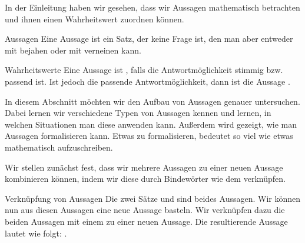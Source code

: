\documentclass[../../main.tex]{subfiles}
\begin{document}
\newcommand{\statementIcon}[3]{
    \begin{tikzpicture}[onbase]
        \node at (0,0) {\texttt{[image: \#1]}};
        \ifthenelse{\equal{#3}{}}{}{
            \draw[line width=2mm,red,opacity=0.6] (-.5,-.5) -- (.5,.5);
            \draw[line width=2mm,red,opacity=0.6] (.5,-.5) -- (-.5,.5);
        }
    \end{tikzpicture}
}
\def\poisonIcn{\statementIcon{images/poison.png}{0.86}{}}
\def\superPwrIcn{\statementIcon{images/super_power.png}{0.86}{}}
\def\superPwrIcnVarI{\statementIcon{images/super_power_index1.png}{0.86}{}}
\def\superPwrIcnVarII{\statementIcon{images/super_power_index2.png}{0.86}{}}
\def\drinkIcn{\statementIcon{images/trinken_TEMP.png}{0.86}{}}
\def\burgerIcn{\statementIcon{images/burger.png}{1.53}{}}
\def\saladIcn{\statementIcon{images/salat.png}{1.39}{}}
\def\friesIcn{\statementIcon{images/pommes.png}{0.86}{}}

In der Einleitung haben wir gesehen, dass wir Aussagen mathematisch betrachten und ihnen einen
Wahrheitswert zuordnen können.

\begin{definition}{Aussagen}
    Eine Aussage ist ein Satz, der keine Frage ist, den man aber entweder mit 
     bejahen oder mit  
    verneinen kann.
\end{definition}

\begin{definition}{Wahrheitswerte}
    Eine Aussage ist \wahr, falls die Antwortmöglichkeit 
    stimmig bzw. passend ist. Ist jedoch  die passende
    Antwortmöglichkeit, dann ist die Aussage \falsch.
\end{definition}

In diesem Abschnitt möchten wir den Aufbau von Aussagen genauer untersuchen. 
Dabei lernen wir verschiedene Typen von Aussagen kennen und lernen, 
in welchen Situationen man diese anwenden kann. Außerdem wird gezeigt, 
wie man Aussagen formalisieren kann. Etwas zu formalisieren, bedeutet so 
viel wie etwas mathematisch aufzuschreiben.

Wir stellen zunächst fest, dass wir mehrere Aussagen zu einer neuen Aussage kombinieren können, indem wir diese durch Bindewörter wie dem  verknüpfen.
\begin{example}{Verknüpfung von Aussagen}
    Die zwei Sätze
     und 
    sind beides Aussagen. Wir können nun aus diesen Aussagen eine neue Aussage basteln. Wir verknüpfen dazu die beiden Aussagen mit einem  zu einer neuen Aussage. Die resultierende Aussage lautet wie folgt: .
\end{example}
\end{document}
